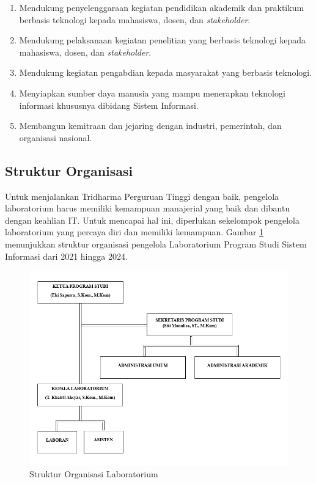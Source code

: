 \begin{enumerate}

	\item Mendukung penyelenggaraan kegiatan pendidikan akademik dan praktikum berbasis teknologi kepada mahasiswa, dosen, dan \textit{stakeholder}.
	\item Mendukung pelaksanaan kegiatan penelitian yang berbasis teknologi kepada mahasiswa, dosen, dan \textit{stakeholder}.
	\item Mendukung kegiatan pengabdian kepada masyarakat yang berbasis teknologi.
	\item Menyiapkan sumber daya manusia yang mampu menerapkan teknologi informasi khususnya dibidang Sistem Informasi.
	\item Membangun kemitraan dan jejaring dengan industri, pemerintah, dan organisasi nasional.

\end{enumerate}
\subsection{Struktur Organisasi}
Untuk menjalankan Tridharma Perguruan Tinggi dengan baik, pengelola laboratorium harus memiliki kemampuan manajerial yang baik dan dibantu dengan keahlian IT. Untuk mencapai hal ini, diperlukan sekelompok pengelola laboratorium yang percaya diri dan memiliki kemampuan. Gambar \ref{fig:struktur-organisasi} menunjukkan struktur organisasi pengelola Laboratorium Program Studi Sistem Informasi dari 2021 hingga 2024.

\begin{figure}[h]
	\centering
	\includegraphics[width=1\linewidth]{konten/gambar/Struktur Organisasi.png}
	\caption{Struktur Organisasi Laboratorium}
	\label{fig:struktur-organisasi}
\end{figure}

